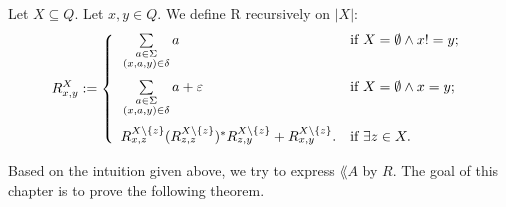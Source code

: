 \begin{definition}
    \label{R}
    Let $X \subseteq Q$. Let $x, y \in Q$.
    We define R recursively on $|X|$:
    \begin{equation*}
        R^X_{x,y} := \left\{  
                \begin{array}{ll}
                    \vphantom{ \sum\limits_{ \substack{ a \in \Sigma\\ (x,a,y) \in \delta \\ b \in \Sigma } } }
                    \sum\limits_{
                        \substack{
                            a \in \Sigma\\
                            (x,a,y) \in \delta
                        }
                    } a 
                    & \mbox{if } X = \emptyset \wedge x != y; \\
                    \vphantom{ \sum\limits_{ \substack{ a \in \Sigma\\ (x,a,y) \in \delta \\ b \in \Sigma } } }
                    \sum\limits_{
                        \substack{
                            a \in \Sigma\\
                            (x,a,y) \in \delta
                        }
                    } a + \varepsilon 
                    & \mbox{if } X = \emptyset \wedge x = y; \\
                     R^{X\backslash\{z\}}_{x,z} (R^{X\backslash\{z\}}_{z,z})^* R^{X\backslash\{z\}}_{z,y} + R^{X\backslash\{z\}}_{x,y}.
                     & \mbox{if } \exists z \in X.
                \end{array}
            \right.
    \end{equation*}
\end{definition}

Based on the intuition given above, we try to express $\lang{A}$ by $R$.
The goal of this chapter is to prove the following theorem. 

